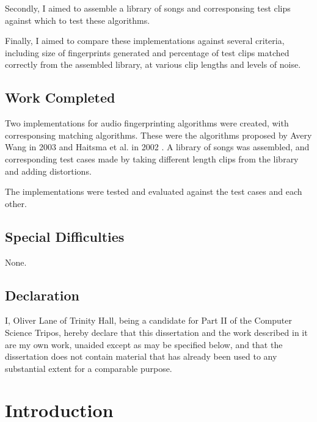 \documentclass[12pt,a4paper,twoside,openright]{report}
\begin{document}
Secondly, I aimed to assemble a library of songs and corresponsing test clips against which to test these algorithms.

Finally, I aimed to compare these implementations against several criteria, including size of fingerprints generated and percentage of test clips matched correctly from the assembled library, at various clip lengths and levels of noise.

\section*{Work Completed}

Two implementations for audio fingerprinting algorithms were created, with corresponsing matching algorithms. These were the algorithms proposed by Avery Wang in 2003 \cite{Wang03} and Haitsma et al. in 2002 \cite{Haitsma02}. A library of songs was assembled, and corresponding test cases made by taking different length clips from the library and adding distortions.

The implementations were tested and evaluated against the test cases and each other.

\section*{Special Difficulties}

None.

 
\newpage
\section*{Declaration}

I, Oliver Lane of Trinity Hall, being a candidate for Part II of the Computer Science Tripos, hereby declare that this dissertation and the work described in  it are my own work, unaided except as may be specified below, and that the  dissertation does not contain material that has already been used to any  substantial extent for a comparable purpose.

\bigskip
{}

\medskip
{}

\tableofcontents

\listoffigures



\pagestyle{headings}

\chapter{Introduction}
\end{document}
